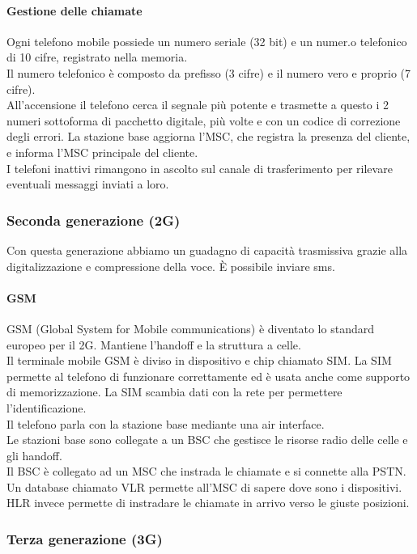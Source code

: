 \documentclass{article}
\begin{document}
	\paragraph{Gestione delle chiamate} Ogni telefono mobile possiede un numero seriale (32 bit) e un numer.o telefonico di 10 cifre, registrato nella memoria. \\
	Il numero telefonico è composto da prefisso (3 cifre) e il numero vero e proprio (7 cifre).\\ All'accensione il telefono cerca il segnale più potente e trasmette a questo i 2 numeri sottoforma di pacchetto digitale, più volte e con un codice di correzione degli errori. La stazione base aggiorna l'MSC, che registra la presenza del cliente, e informa l'MSC principale del cliente. \\
	I telefoni inattivi rimangono in ascolto sul canale di trasferimento per rilevare eventuali messaggi inviati a loro. 
	\subsubsection{Seconda generazione (2G)}
	Con questa generazione abbiamo un guadagno di capacità trasmissiva grazie alla digitalizzazione e compressione della voce. È possibile inviare sms.
	\paragraph{GSM} GSM (Global System for Mobile communications) è diventato lo standard europeo per il 2G. Mantiene l'handoff e la struttura a celle. \\
	Il terminale mobile GSM è diviso in dispositivo e chip chiamato SIM. La SIM permette al telefono di funzionare correttamente ed è usata anche come supporto di memorizzazione. La SIM scambia dati con la rete per permettere l'identificazione. \\
	Il telefono parla con la stazione base mediante una air interface.\\
	Le stazioni base sono collegate a un BSC che gestisce le risorse radio delle celle e gli handoff. \\
	Il BSC è collegato ad un MSC che instrada le chiamate e si connette alla PSTN.\\
	Un database chiamato VLR permette all'MSC di sapere dove sono i dispositivi. HLR invece permette di instradare le chiamate in arrivo verso le giuste posizioni.  
	\subsubsection{Terza generazione (3G)}
\end{document}
